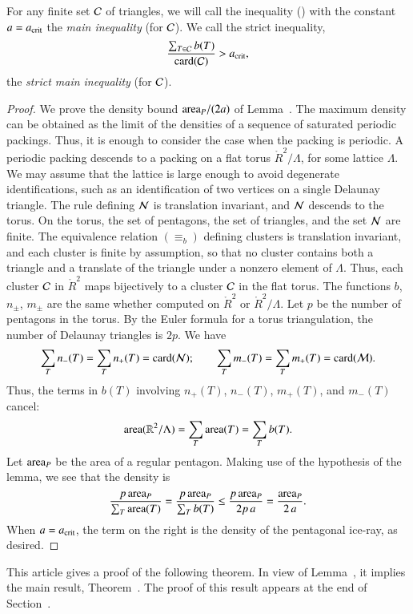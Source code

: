 For any finite set $\mathcal C$ of triangles, we will call the inequality
() with the constant $a=a_\text{crit}$ the {\it main inequality}
(for $\mathcal C$).  We call the strict inequality,
\begin{equation}\libel{eqn:strict-main}
\frac{\sum_{T\in \C} b(T)}{\card(\C)} > \acrit,
\end{equation}
the {\it strict main inequality} (for $\mathcal C$).

\begin{proof}
  We prove the density bound ${\operatorname{area}}_P/(2a)$ of Lemma~.
  The maximum density can be obtained as the limit of the
  densities of a sequence of saturated periodic packings.  Thus, it is
  enough to consider the case when the packing is periodic.  A
  periodic packing descends to a packing on a flat torus
  $\ring{R}^2/\Lambda$, for some lattice $\Lambda$. We may assume that
  the lattice is large enough to avoid degenerate identifications, such
  as an identification of two vertices on a single Delaunay triangle.
  The rule defining
  $\mathcal N$ is translation invariant, and $\mathcal N$ descends to the torus.  On
  the torus, the set of pentagons, the set of triangles, and the set
  $\mathcal N$ are finite.  The equivalence relation $(\equiv_b)$ defining
  clusters is translation invariant, and each cluster is finite by
  assumption, so that no cluster contains both a triangle and a
  translate of the triangle under a nonzero element of $\Lambda$.
  Thus, each cluster $\mathcal C$ in $\ring{R}^2$ maps bijectively to a
  cluster $\mathcal C$ in the flat torus.  The functions $b$, $n_\pm$, $m_\pm$
  are the same whether computed on $\ring{R}^2$ or
  $\ring{R}^2/\Lambda$.  Let $p$ be the number of pentagons in the
  torus.  By the Euler formula for a torus triangulation, the number
  of Delaunay triangles is $2p$.  We have
\[
\sum_{T} n_-(T) =  \sum_{T} n_+(T) = {\operatorname{card}}(\mathcal N);\qquad
\sum_{T} m_-(T) =  \sum_{T} m_+(T) = {\operatorname{card}}(\mathcal M).
\]
Thus, the terms in $b(T)$ involving $n_+(T)$, $n_-(T)$, $m_+(T)$,
and $m_-(T)$ cancel:
\[
{\operatorname{area}}(\mathbb{R}^2/\Lambda) = \sum_T {\operatorname{area}}(T) = \sum_T b(T).
\]    
Let ${\operatorname{area}}_P$ be the area of a regular pentagon.  Making use of the
hypothesis of the lemma, we see that the density is
\[
\frac{p\, {\operatorname{area}}_P}{\sum_T {\operatorname{area}}(T)} 
=\frac{p\, {\operatorname{area}}_P}{\sum_T b(T)} \le\frac{p\, {\operatorname{area}}_P}{2 p\, a} 
= \frac{{\operatorname{area}}_P}{2\, a}.
\]
When $a=a_\text{crit}$, the term on the right is the density of the
pentagonal ice-ray, as desired.
\end{proof}

This article gives a proof of the following theorem. In view of
Lemma~, it implies the main result,
Theorem~.  The proof of this result appears at the end
of Section~.


